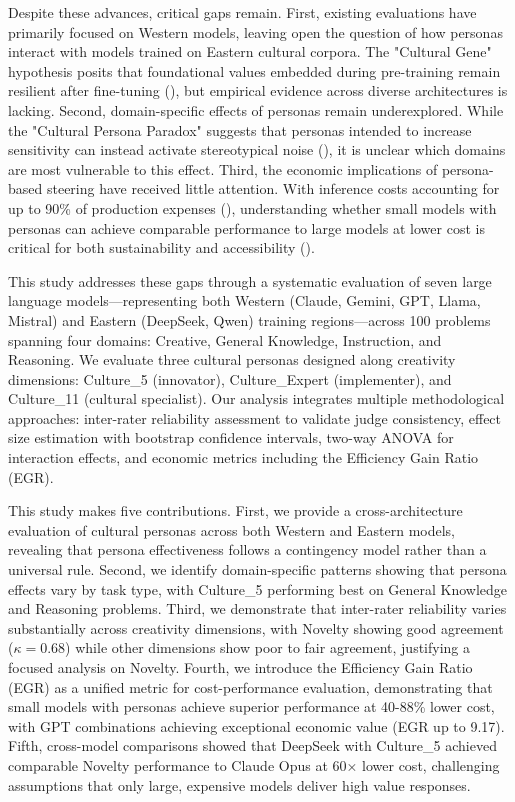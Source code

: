 \documentclass{article}
\begin{document}
Despite these advances, critical gaps remain. First, existing evaluations have primarily focused on Western models, leaving open the question of how personas interact with models trained on Eastern cultural corpora. The "Cultural Gene" hypothesis posits that foundational values embedded during pre-training remain resilient after fine-tuning (\cite{emanuel_z__fenech_borg_a4a3e300}), but empirical evidence across diverse architectures is lacking. Second, domain-specific effects of personas remain underexplored. While the "Cultural Persona Paradox" suggests that personas intended to increase sensitivity can instead activate stereotypical noise (\cite{mahammed_kamruzzaman_a0ec385e, kharchenkoHowWellLLMs2024}), it is unclear which domains are most vulnerable to this effect. Third, the economic implications of persona-based steering have received little attention. With inference costs accounting for up to 90\% of production expenses (\cite{francisco_dur_n_a28bb68b}), understanding whether small models with personas can achieve comparable performance to large models at lower cost is critical for both sustainability and accessibility (\cite{anuj_kumar_1c38e9e4, jennifer_haase_36a334aa}).

This study addresses these gaps through a systematic evaluation of seven large language models—representing both Western (Claude, Gemini, GPT, Llama, Mistral) and Eastern (DeepSeek, Qwen) training regions—across 100 problems spanning four domains: Creative, General Knowledge, Instruction, and Reasoning. We evaluate three cultural personas designed along creativity dimensions: Culture\_5 (innovator), Culture\_Expert (implementer), and Culture\_11 (cultural specialist). Our analysis integrates multiple methodological approaches: inter-rater reliability assessment to validate judge consistency, effect size estimation with bootstrap confidence intervals, two-way ANOVA for interaction effects, and economic metrics including the Efficiency Gain Ratio (EGR).

This study makes five contributions. First, we provide a cross-architecture evaluation of cultural personas across both Western and Eastern models, revealing that persona effectiveness follows a contingency model rather than a universal rule. Second, we identify domain-specific patterns showing that persona effects vary by task type, with Culture\_5 performing best on General Knowledge and Reasoning problems. Third, we demonstrate that inter-rater reliability varies substantially across creativity dimensions, with Novelty showing good agreement (\(\kappa = 0.68\)) while other dimensions show poor to fair agreement, justifying a focused analysis on Novelty. Fourth, we introduce the Efficiency Gain Ratio (EGR) as a unified metric for cost-performance evaluation, demonstrating that small models with personas achieve superior performance at 40-88\% lower cost, with GPT combinations achieving exceptional economic value (EGR up to 9.17). Fifth, cross-model comparisons showed that DeepSeek with Culture\_5 achieved comparable Novelty performance to Claude Opus at 60× lower cost, challenging assumptions that only large, expensive models deliver high value responses.
\end{document}
